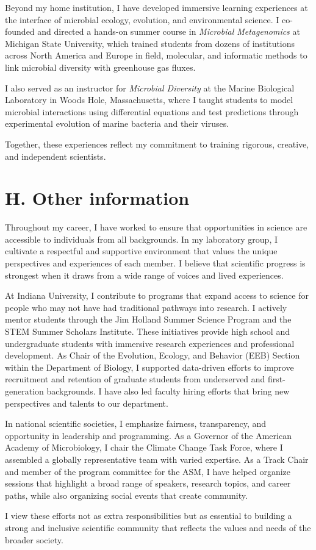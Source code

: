 \documentclass[11pt]{article}  %
\begin{document}
Beyond my home institution, I have developed immersive learning experiences at the interface of microbial ecology, evolution, and environmental science. I co-founded and directed a hands-on summer course in \textit{Microbial Metagenomics} at Michigan State University, which trained students from dozens of institutions across North America and Europe in field, molecular, and informatic methods to link microbial diversity with greenhouse gas fluxes. 

I also served as an instructor for \textit{Microbial Diversity} at the Marine Biological Laboratory in Woods Hole, Massachusetts, where I taught students to model microbial interactions using differential equations and test predictions through experimental evolution of marine bacteria and their viruses.

Together, these experiences reflect my commitment to training rigorous, creative, and independent scientists.

\section*{H. Other information}
\vspace{-0.5em}
Throughout my career, I have worked to ensure that opportunities in science are accessible to individuals from all backgrounds. In my laboratory group, I cultivate a respectful and supportive environment that values the unique perspectives and experiences of each member. I believe that scientific progress is strongest when it draws from a wide range of voices and lived experiences.

At Indiana University, I contribute to programs that expand access to science for people who may not have had traditional pathways into research. I actively mentor students through the Jim Holland Summer Science Program and the STEM Summer Scholars Institute. These initiatives provide high school and undergraduate students with immersive research experiences and professional development. As Chair of the Evolution, Ecology, and Behavior (EEB) Section within the Department of Biology, I supported data-driven efforts to improve recruitment and retention of graduate students from underserved and first-generation backgrounds. I have also led faculty hiring efforts that bring new perspectives and talents to our department.

In national scientific societies, I emphasize fairness, transparency, and opportunity in leadership and programming. As a Governor of the American Academy of Microbiology, I chair the Climate Change Task Force, where I assembled a globally representative team with varied expertise. As a Track Chair and member of the program committee for the ASM, I have helped organize sessions that highlight a broad range of speakers, research topics, and career paths, while also organizing social events that create community. 

I view these efforts not as extra responsibilities but as essential to building a strong and inclusive scientific community that reflects the values and needs of the broader society.
\end{document}
